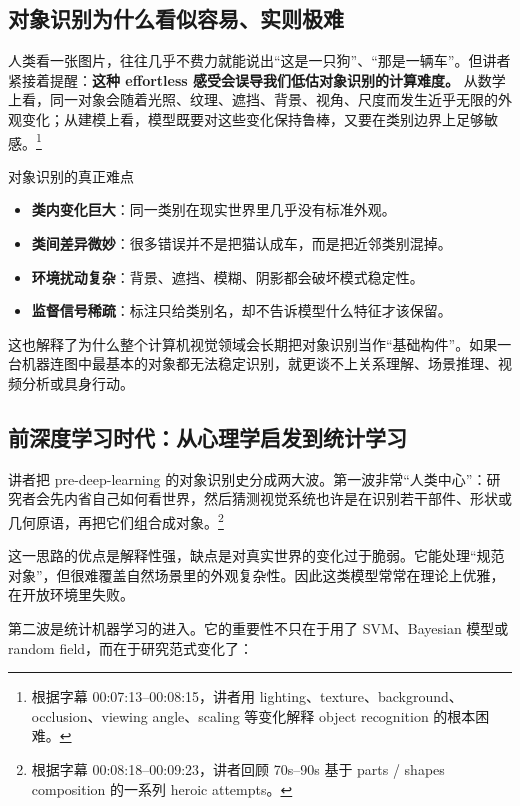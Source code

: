 \subsection{对象识别为什么看似容易、实则极难}

人类看一张图片，往往几乎不费力就能说出``这是一只狗''、``那是一辆车''。但讲者紧接着提醒：\textbf{这种 effortless 感受会误导我们低估对象识别的计算难度。} 从数学上看，同一对象会随着光照、纹理、遮挡、背景、视角、尺度而发生近乎无限的外观变化；从建模上看，模型既要对这些变化保持鲁棒，又要在类别边界上足够敏感。\footnote{根据字幕 00:07:13--00:08:15，讲者用 lighting、texture、background、occlusion、viewing angle、scaling 等变化解释 object recognition 的根本困难。}

\begin{knowledgebox}{对象识别的真正难点}
\begin{itemize}
    \item \textbf{类内变化巨大}：同一类别在现实世界里几乎没有标准外观。
    \item \textbf{类间差异微妙}：很多错误并不是把猫认成车，而是把近邻类别混掉。
    \item \textbf{环境扰动复杂}：背景、遮挡、模糊、阴影都会破坏模式稳定性。
    \item \textbf{监督信号稀疏}：标注只给类别名，却不告诉模型什么特征才该保留。
\end{itemize}
\end{knowledgebox}

这也解释了为什么整个计算机视觉领域会长期把对象识别当作``基础构件''。如果一台机器连图中最基本的对象都无法稳定识别，就更谈不上关系理解、场景推理、视频分析或具身行动。

\subsection{前深度学习时代：从心理学启发到统计学习}

讲者把 pre-deep-learning 的对象识别史分成两大波。第一波非常``人类中心''：研究者会先内省自己如何看世界，然后猜测视觉系统也许是在识别若干部件、形状或几何原语，再把它们组合成对象。\footnote{根据字幕 00:08:18--00:09:23，讲者回顾 70s--90s 基于 parts / shapes composition 的一系列 heroic attempts。}

这一思路的优点是解释性强，缺点是对真实世界的变化过于脆弱。它能处理``规范对象''，但很难覆盖自然场景里的外观复杂性。因此这类模型常常在理论上优雅，在开放环境里失败。

第二波是统计机器学习的进入。它的重要性不只在于用了 SVM、Bayesian 模型或 random field，而在于研究范式变化了：

